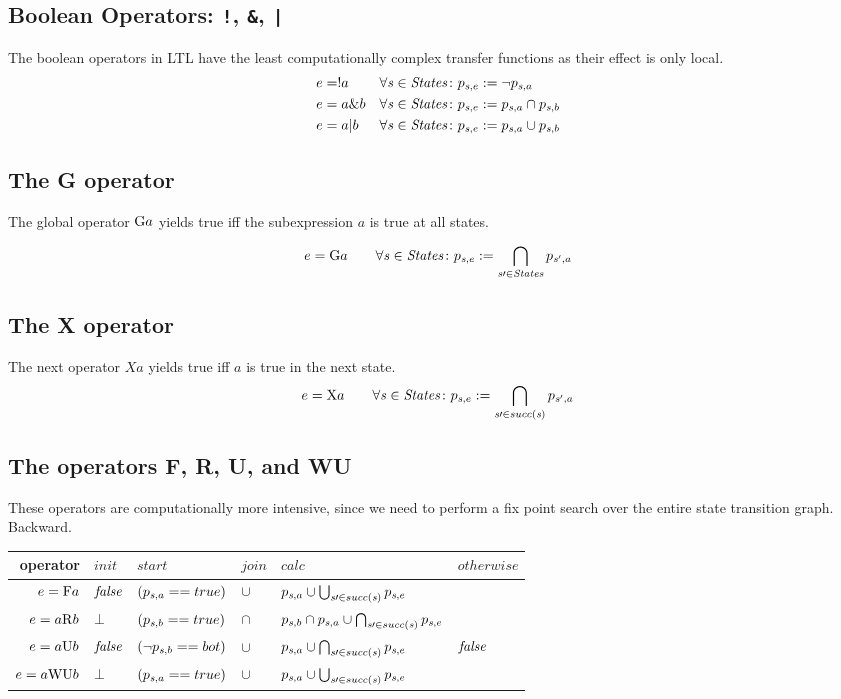 \subsection{Boolean Operators: \texttt{!}, \texttt{\&}, \texttt{|}}
The boolean operators in LTL have the least computationally complex
transfer functions as their effect is only local.
\begin{align*}
e &= !a  & \forall\mathit{s}\in\mathit{States}\colon p_{\mathit{s},e} &:= \neg p_{\mathit{s},a}\\
e &= a \& b & \forall\mathit{s}\in\mathit{States}\colon p_{\mathit{s},e} &:= p_{\mathit{s},a} \cap p_{\mathit{s},b}\\
e &= a | b & \forall\mathit{s}\in\mathit{States}\colon p_{\mathit{s},e} &:= p_{\mathit{s},a} \cup p_{\mathit{s},b}\\
\end{align*}

\subsection{The G operator}
The global operator $\mathrm{G} a$ yields true iff the subexpression $a$ is true at
all states.

\[ e = \mathrm{G} a \qquad \forall\mathit{s}\in\mathit{States}\colon p_{\mathit{s},e} :=\bigcap_{\mathit{s}\prime\in\mathit{States}}{p_{\mathit{s}',a}} \]

\subsection{The X operator}
The next operator $X a$ yields true iff $a$ is true in the next state.
\[ e = \mathrm{X} a \qquad\forall\mathit{s}\in\mathit{States}\colon p_{\mathit{s},e}:=\bigcap_{\mathit{s}\prime\in succ(\mathit{s})}{p_{\mathit{s}',a}} \]

\subsection{The operators F, R, U, and WU}
These operators are computationally more intensive, since we need to
perform a fix point search over the entire state transition graph. Backward.
\begin{tabular}{rlllll}
\toprule
operator & $\mathit{init}$ & $\mathit{start}$ & $\mathit{join}$ &
$\mathit{calc}$ & $\mathit{otherwise}$ \\\midrule

$e = \mathrm{F} a$  & $\mathit{false}$ & $(p_{\mathit{s},a}==true)$ & $\cup$ & 
$p_{\mathit{s},a}\cup\bigcup_{\mathit{s}\prime\in succ(\mathit{s})}{p_{\mathit{s},e}}$ &\\

$e = a \mathrm{R} b$ & $\bot$ & $(p_{\mathit{s},b}==true)$ & $\cap$ &
$p_{\mathit{s},b} \cap p_{\mathit{s},a} \cup \bigcap_{\mathit{s}\prime\in succ(\mathit{s})}{p_{\mathit{s},e}}$\\

$e = a \mathrm{U} b$ & $\mathit{false}$ & $(\neg p_{\mathit{s},b}==bot)$ &
$\cup$ & $p_{\mathit{s},a} \cup\bigcap_{\mathit{s}\prime\in succ(\mathit{s})}{p_{\mathit{s},e}}$ & $\mathit{false}$\\

$e = a \mathrm{WU} b$ & $\bot$ & $(p_{\mathit{s},a}==true)$ & $\cup$ &
$p_{\mathit{s},a} \cup \bigcup_{\mathit{s}\prime\in succ(\mathit{s})}{p_{\mathit{s},e}}$\\\bottomrule
\end{tabular}


